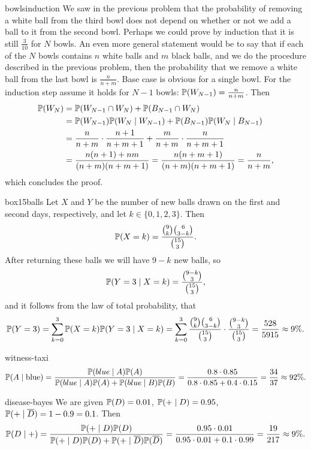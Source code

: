 \begin{sol}{bowlsinduction}
    We saw in the previous problem that the probability of removing a white ball from the third bowl does not depend on whether or not we add a ball to it from the second bowl. Perhaps we could prove by induction that it is still $\frac{3}{10}$ for $N$ bowls. An even more general statement would be to say that if each of the $N$ bowls contains $n$ white balls and $m$ black balls, and we do the procedure described in the previous problem, then the probability that we remove a white ball from the last bowl is $\frac{n}{n+m}$. Base case is obvious for a single bowl. For the induction step assume it holds for $N-1$ bowls: $\mathbb{P}(W_{N-1})=\frac{n}{n+m}$. Then
    \begin{align*}
        \mathbb{P}(W_{N})&=\mathbb{P}(W_{N-1}\cap W_N)+\mathbb{P}(B_{N-1}\cap W_N)\\
        &=\mathbb{P}(W_{N-1})\mathbb{P}(W_N\mid W_{N-1})+\mathbb{P}(B_{N-1})\mathbb{P}(W_N\mid B_{N-1})\\
        &=\frac{n}{n+m}\cdot\frac{n+1}{n+m+1}+\frac{m}{n+m}\cdot\frac{n}{n+m+1}\\
        &=\frac{n(n+1)+nm}{(n+m)(n+m+1)}=\frac{n(n+m+1)}{(n+m)(n+m+1)}=\frac{n}{n+m},
    \end{align*}
    which concludes the proof.
\end{sol}

\begin{sol}{box15balls}
    Let $X$ and $Y$ be the number of new balls drawn on the first and second days, respectively, and let $k\in\{0,1,2,3\}$. Then
    \[
        \mathbb{P}(X=k)=\frac{\binom{9}{k}\binom{6}{3-k}}{\binom{15}{3}}.
    \]
    After returning these balls we will have $9-k$ new balls, so
    \[
        \mathbb{P}(Y=3\mid X=k)=\frac{\binom{9-k}{3}}{\binom{15}{3}},
    \]
    and it follows from the law of total probability, that
    \[
        \mathbb{P}(Y=3)=\sum_{k=0}^{3}\mathbb{P}(X=k)\mathbb{P}(Y=3\mid X=k)=\sum_{k=0}^{3}\frac{\binom{9}{k}\binom{6}{3-k}}{\binom{15}{3}}\cdot\frac{\binom{9-k}{3}}{\binom{15}{3}}=\frac{528}{5915}\approx9\%.
    \]
\end{sol}

\begin{sol}{witness-taxi}
    \[
        \mathbb{P}(A\mid\text{blue})=\frac{\mathbb{P}(blue\mid A)\mathbb{P}(A)}{\mathbb{P}(blue\mid A)\mathbb{P}(A)+\mathbb{P}(blue\mid B)\mathbb{P}(B)}=\frac{0.8\cdot0.85}{0.8\cdot0.85+0.4\cdot0.15}=\frac{34}{37}\approx92\%.
    \]
\end{sol}

\begin{sol}{disease-bayes}
    We are given $\mathbb{P}(D)=0.01$, $\mathbb{P}(+\mid D)=0.95$, $\mathbb{P}(+\mid\overline{D})=1-0.9=0.1$. Then
    \[
        \mathbb{P}(D\mid+)=\frac{\mathbb{P}(+\mid D)\mathbb{P}(D)}{\mathbb{P}(+\mid D)\mathbb{P}(D)+\mathbb{P}(+\mid\overline{D})\mathbb{P}(\overline{D})}=\frac{0.95\cdot0.01}{0.95\cdot0.01+0.1\cdot0.99}=\frac{19}{217}\approx9\%.
    \]
\end{sol}

